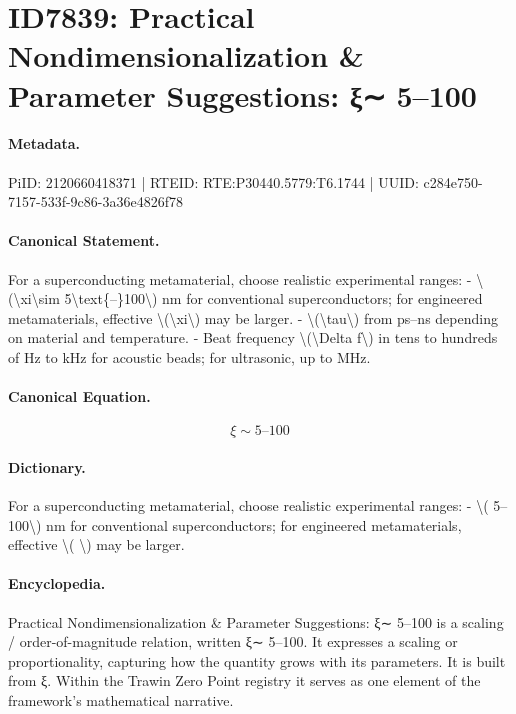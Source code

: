 \section*{ID7839: Practical Nondimensionalization \& Parameter Suggestions: ξ∼ 5–100}
\paragraph{Metadata.}
PiID: 2120660418371 | RTEID: RTE:P30440.5779:T6.1744 | UUID: c284e750-7157-533f-9c86-3a36e4826f78

\paragraph{Canonical Statement.}
For a superconducting metamaterial, choose realistic experimental ranges: - \textbackslash{}(\textbackslash{}xi\textbackslash{}sim 5\textbackslash{}text\{–\}100\textbackslash{}) nm for conventional superconductors; for engineered metamaterials, effective \textbackslash{}(\textbackslash{}xi\textbackslash{}) may be larger. - \textbackslash{}(\textbackslash{}tau\textbackslash{}) from ps–ns depending on material and temperature. - Beat frequency \textbackslash{}(\textbackslash{}Delta f\textbackslash{}) in tens to hundreds of Hz to kHz for acoustic beads; for ultrasonic, up to MHz.

\paragraph{Canonical Equation.}
\[
\xi\sim 5\text{–}100
\]

\paragraph{Dictionary.}
For a superconducting metamaterial, choose realistic experimental ranges: - \textbackslash{}( 5–100\textbackslash{}) nm for conventional superconductors; for engineered metamaterials, effective \textbackslash{}( \textbackslash{}) may be larger.

\paragraph{Encyclopedia.}
Practical Nondimensionalization \& Parameter Suggestions: ξ∼ 5–100 is a scaling / order-of-magnitude relation, written ξ∼ 5–100. It expresses a scaling or proportionality, capturing how the quantity grows with its parameters. It is built from ξ. Within the Trawin Zero Point registry it serves as one element of the framework's mathematical narrative.
